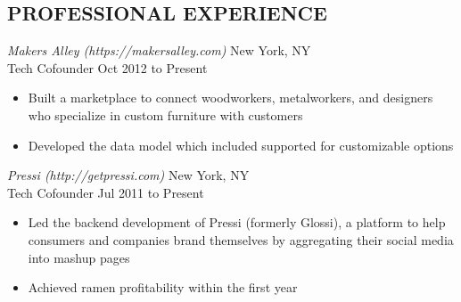 \documentclass{res}
\begin{document}
\thispagestyle{empty} %


\address{80 Park Avenue, Apt 3D\hspace{0.1in}\vline\hspace{0.1in}Hoboken, NJ 07030
\hspace{0.1in}\vline\hspace{0.1in}
dangoldin@gmail.com\hspace{0.1in}\vline\hspace{0.1in}(201) 341-3384}

\begin{resume}

\section{PROFESSIONAL EXPERIENCE}
\vspace{3pt}
{\sl Makers Alley (https://makersalley.com)} \hfill New York, NY \\
Tech Cofounder \hfill   Oct 2012 to Present
   \begin{itemize} \itemsep -2pt %
   \item Built a marketplace to connect woodworkers, metalworkers, and designers who specialize in custom furniture with customers
   \item Developed the data model which included supported for customizable options
 \end{itemize} %

{\sl Pressi (http://getpressi.com)} \hfill New York, NY \\
Tech Cofounder \hfill   Jul 2011 to Present
   \begin{itemize} \itemsep -2pt %
   \item Led the backend development of Pressi (formerly Glossi), a platform to help consumers and companies brand themselves by aggregating their social media into mashup pages
   \item Achieved ramen profitability within the first year
 \end{itemize} %


\end{resume}
\end{document}

